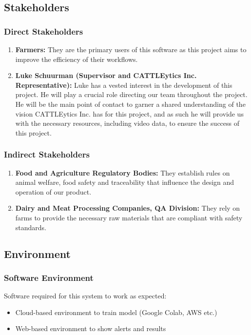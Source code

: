 \documentclass{article}
\begin{document}
\subsection{Stakeholders}
\subsubsection{Direct Stakeholders}
\begin{enumerate}
    \item \textbf{Farmers:} They are the primary users of this software as this project aims to improve the efficiency of their workflows.
    \item \textbf{Luke Schuurman (Supervisor and CATTLEytics Inc. Representative):} Luke has a vested interest in the development of this project. He will
    play a crucial role directing our team throughout the project. He will be the main point of contact to garner a shared understanding of the vision CATTLEytics Inc. has
    for this project, and as such he will provide us with the necessary resources, including video data, to ensure the success of this project.
\end{enumerate}

\subsubsection{Indirect Stakeholders}
\begin{enumerate}
    \item \textbf{Food and Agriculture Regulatory Bodies:} They establish rules on animal welfare, food safety and traceability that influence the design and operation of our product.
    \item \textbf{Dairy and Meat Processing Companies, QA Division:} They rely on farms to provide the necessary raw materials that are compliant with safety standards.
\end{enumerate}


\subsection{Environment}
\subsubsection{Software Environment}
Software required for this system to work as expected:
\begin{itemize}
    \item Cloud-based environment to train model (Google Colab, AWS etc.)
    \item Web-based environment to show alerts and results
\end{itemize}
\end{document}
